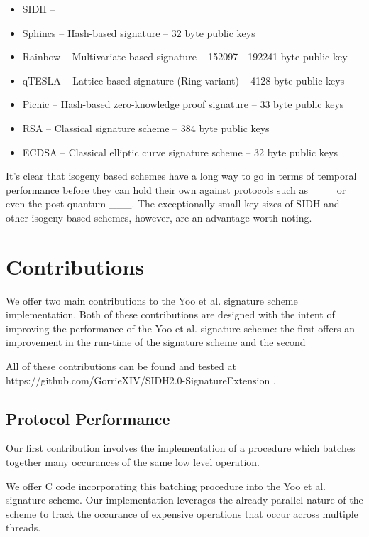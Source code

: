 \begin{itemize}
\item SIDH --
\item Sphincs -- Hash-based signature -- 32 byte public keys
\item Rainbow -- Multivariate-based signature -- 152097 - 192241 byte public key
\item qTESLA -- Lattice-based signature (Ring variant) -- 4128 byte public keys
\item Picnic -- Hash-based zero-knowledge proof signature -- 33 byte public keys
\item RSA -- Classical signature scheme --  384 byte public keys
\item ECDSA -- Classical elliptic curve signature scheme -- 32 byte public keys
\end{itemize}

It's clear that isogeny based schemes have a long way to go in terms of temporal performance before they can hold their own against protocols such as \_\_\_ or even the post-quantum \_\_\_. The exceptionally small key sizes of SIDH and other isogeny-based schemes, however, are an advantage worth noting. 

\section{Contributions}

We offer two main contributions to the Yoo et al. signature scheme implementation. Both of these contributions are designed with the intent of improving the performance of the Yoo et al. signature scheme: the first offers an improvement in the run-time of the signature scheme and the second 

All of these contributions can be found and tested at https://github.com/GorrieXIV/SIDH2.0-SignatureExtension .

\subsection{Protocol Performance}

Our first contribution involves the implementation of a procedure which batches together many occurances of the same low level operation.

We offer C code incorporating this batching procedure into the Yoo et al. signature scheme. Our implementation leverages the already parallel nature of the scheme to track the occurance of expensive operations that occur across multiple threads.

